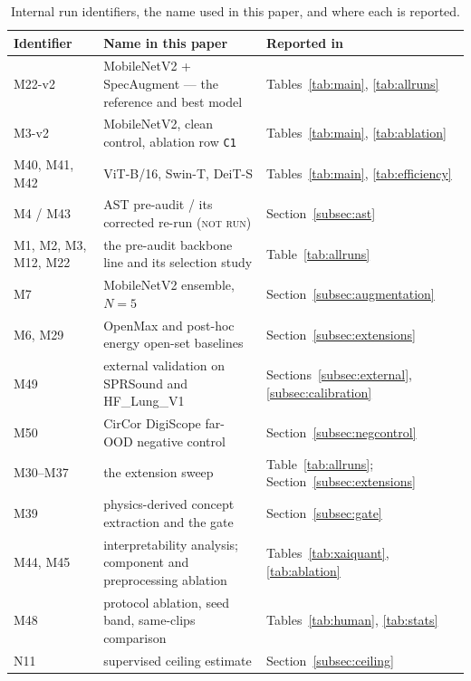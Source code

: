 \documentclass[journal,onecolumn]{IEEEtran}
\newcommand{\notrun}{\textsc{not run}}
\begin{document}
\begin{table}[!htbp]
\centering
\caption{Internal run identifiers, the name used in this paper, and where each is reported.}
\label{tab:runmap}
\footnotesize
\begin{tabular}{lll}
\toprule
Identifier & Name in this paper & Reported in \\
\midrule
M22-v2 & MobileNetV2 + SpecAugment --- the reference and best model & Tables~\ref{tab:main}, \ref{tab:allruns} \\
M3-v2 & MobileNetV2, clean control, ablation row \texttt{C1} & Tables~\ref{tab:main}, \ref{tab:ablation} \\
M40, M41, M42 & ViT-B/16, Swin-T, DeiT-S & Tables~\ref{tab:main}, \ref{tab:efficiency} \\
M4 / M43 & AST pre-audit / its corrected re-run (\notrun) & Section~\ref{subsec:ast} \\
M1, M2, M3, M12, M22 & the pre-audit backbone line and its selection study & Table~\ref{tab:allruns} \\
M7 & MobileNetV2 ensemble, $N = 5$ & Section~\ref{subsec:augmentation} \\
M6, M29 & OpenMax and post-hoc energy open-set baselines & Section~\ref{subsec:extensions} \\
M49 & external validation on SPRSound and HF\_Lung\_V1 & Sections~\ref{subsec:external}, \ref{subsec:calibration} \\
M50 & CirCor DigiScope far-OOD negative control & Section~\ref{subsec:negcontrol} \\
M30--M37 & the extension sweep & Table~\ref{tab:allruns}; Section~\ref{subsec:extensions} \\
M39 & physics-derived concept extraction and the gate & Section~\ref{subsec:gate} \\
M44, M45 & interpretability analysis; component and preprocessing ablation & Tables~\ref{tab:xaiquant}, \ref{tab:ablation} \\
M48 & protocol ablation, seed band, same-clips comparison & Tables~\ref{tab:human}, \ref{tab:stats} \\
N11 & supervised ceiling estimate & Section~\ref{subsec:ceiling} \\
\bottomrule
\end{tabular}
\end{table}



\end{document}
